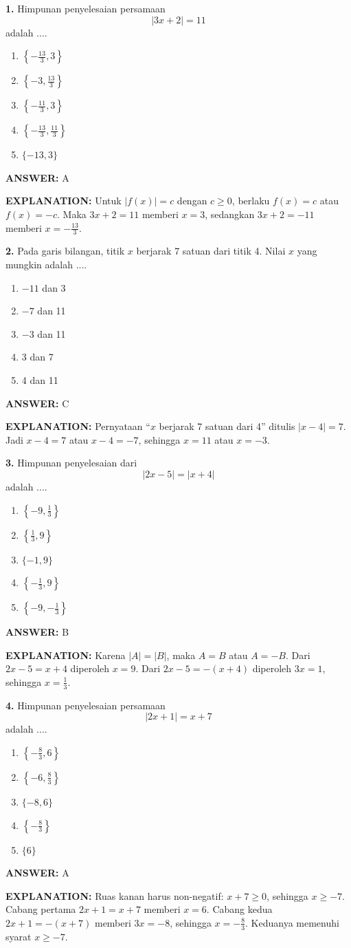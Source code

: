 \documentclass[11pt,a4paper]{article}
\newcommand{\answer}[1]{\par\medskip\textbf{\color{jawab}ANSWER:} #1\par}
\newcommand{\explanation}[1]{\textbf{\color{jelas}EXPLANATION:} #1\par\medskip}
\newcommand{\question}[1]{\Needspace{8\baselineskip}\par\medskip\textbf{#1}\quad}
\newenvironment{choices}{\begin{enumerate}[label=\Alph*.,leftmargin=1.8em]}{\end{enumerate}}
\begin{document}
\question{1.} Himpunan penyelesaian persamaan
\[
|3x+2|=11
\]
adalah ....
\begin{choices}
\item $\left\{-\frac{13}{3},3\right\}$
\item $\left\{-3,\frac{13}{3}\right\}$
\item $\left\{-\frac{11}{3},3\right\}$
\item $\left\{-\frac{13}{3},\frac{11}{3}\right\}$
\item $\{-13,3\}$
\end{choices}
\answer{A}
\explanation{Untuk $|f(x)|=c$ dengan $c\ge0$, berlaku $f(x)=c$ atau $f(x)=-c$. Maka $3x+2=11$ memberi $x=3$, sedangkan $3x+2=-11$ memberi $x=-\frac{13}{3}$.}

\question{2.} Pada garis bilangan, titik $x$ berjarak 7 satuan dari titik 4. Nilai $x$ yang mungkin adalah ....
\begin{choices}
\item $-11$ dan 3
\item $-7$ dan 11
\item $-3$ dan 11
\item 3 dan 7
\item 4 dan 11
\end{choices}
\answer{C}
\explanation{Pernyataan ``$x$ berjarak 7 satuan dari 4'' ditulis $|x-4|=7$. Jadi $x-4=7$ atau $x-4=-7$, sehingga $x=11$ atau $x=-3$.}

\question{3.} Himpunan penyelesaian dari
\[
|2x-5|=|x+4|
\]
adalah ....
\begin{choices}
\item $\left\{-9,\frac13\right\}$
\item $\left\{\frac13,9\right\}$
\item $\{-1,9\}$
\item $\left\{-\frac13,9\right\}$
\item $\left\{-9,-\frac13\right\}$
\end{choices}
\answer{B}
\explanation{Karena $|A|=|B|$, maka $A=B$ atau $A=-B$. Dari $2x-5=x+4$ diperoleh $x=9$. Dari $2x-5=-(x+4)$ diperoleh $3x=1$, sehingga $x=\frac13$.}

\question{4.} Himpunan penyelesaian persamaan
\[
|2x+1|=x+7
\]
adalah ....
\begin{choices}
\item $\left\{-\frac83,6\right\}$
\item $\left\{-6,\frac83\right\}$
\item $\{-8,6\}$
\item $\left\{-\frac83\right\}$
\item $\{6\}$
\end{choices}
\answer{A}
\explanation{Ruas kanan harus non-negatif: $x+7\ge0$, sehingga $x\ge-7$. Cabang pertama $2x+1=x+7$ memberi $x=6$. Cabang kedua $2x+1=-(x+7)$ memberi $3x=-8$, sehingga $x=-\frac83$. Keduanya memenuhi syarat $x\ge-7$.}
\end{document}
